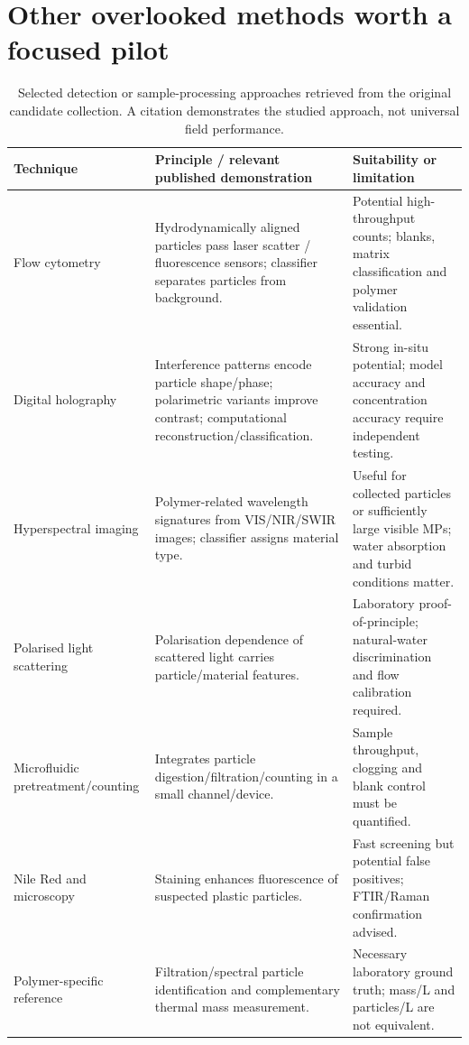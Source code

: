 \documentclass[10pt,a4paper]{article}
\begin{document}
\section{Other overlooked methods worth a focused pilot}
\begin{table}[H]\centering\footnotesize
\caption{Selected detection or sample-processing approaches retrieved from the original candidate collection. A citation demonstrates the studied approach, not universal field performance.}\label{tab:other}
\begin{tabularx}{\linewidth}{@{}p{2.55cm}X X@{}}\toprule
Technique & Principle / relevant published demonstration & Suitability or limitation \\\midrule
Flow cytometry \cite{Minor2023,FlowCyto2024} & Hydrodynamically aligned particles pass laser scatter / fluorescence sensors; classifier separates particles from background. & Potential high-throughput counts; blanks, matrix classification and polymer validation essential. \\
Digital holography \cite{DIHM2023,Lopera2026,Holography2024} & Interference patterns encode particle shape/phase; polarimetric variants improve contrast; computational reconstruction/classification. & Strong in-situ potential; model accuracy and concentration accuracy require independent testing. \\
Hyperspectral imaging \cite{SWIR2021,PoRiver2022} & Polymer-related wavelength signatures from VIS/NIR/SWIR images; classifier assigns material type. & Useful for collected particles or sufficiently large visible MPs; water absorption and turbid conditions matter. \\
Polarised light scattering \cite{Polarized2021} & Polarisation dependence of scattered light carries particle/material features. & Laboratory proof-of-principle; natural-water discrimination and flow calibration required. \\
Microfluidic pretreatment/counting \cite{Microfluidics2023} & Integrates particle digestion/filtration/counting in a small channel/device. & Sample throughput, clogging and blank control must be quantified. \\
Nile Red and microscopy \cite{ErniCassola2017,Minor2023} & Staining enhances fluorescence of suspected plastic particles. & Fast screening but potential false positives; FTIR/Raman confirmation advised. \\
Polymer-specific reference \cite{Ermolin2024,Sefiloglu2024} & Filtration/spectral particle identification and complementary thermal mass measurement. & Necessary laboratory ground truth; mass/L and particles/L are not equivalent. \\
\bottomrule\end{tabularx}
\end{table}
\end{document}
